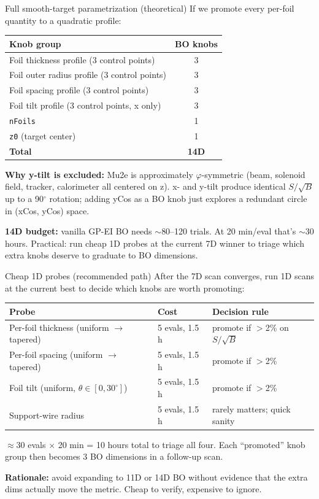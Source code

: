 \documentclass[10pt,aspectratio=169]{beamer}
\begin{document}
\begin{frame}{Full smooth-target parametrization (theoretical)}
If we promote every per-foil quantity to a quadratic profile:

\medskip
\begin{tabular}{lc}
\toprule
Knob group & BO knobs \\
\midrule
Foil thickness profile (3 control points) & 3 \\
Foil outer radius profile (3 control points) & 3 \\
Foil spacing profile (3 control points) & 3 \\
Foil tilt profile (3 control points, x only) & 3 \\
\texttt{nFoils} & 1 \\
\texttt{z0} (target center) & 1 \\
\midrule
\textbf{Total} & \textbf{14D} \\
\bottomrule
\end{tabular}

\medskip
\textbf{Why y-tilt is excluded:} Mu2e is approximately $\varphi$-symmetric (beam,
solenoid field, tracker, calorimeter all centered on z). x- and y-tilt produce
identical $S/\sqrt{B}$ up to a 90$^{\circ}$ rotation; adding yCos as a BO knob just
explores a redundant circle in (xCos, yCos) space.

\medskip
\textbf{14D budget:} vanilla GP-EI BO needs $\sim$80--120 trials. At 20 min/eval
that's $\sim$30 hours.
Practical: run cheap 1D probes at the current 7D winner to triage which extra knobs deserve to graduate to BO dimensions.
\end{frame}

\begin{frame}{Cheap 1D probes (recommended path)}
After the 7D scan converges, run 1D scans at the current best to decide which
knobs are worth promoting:

\medskip
\begin{tabular}{lll}
\toprule
Probe & Cost & Decision rule \\
\midrule
Per-foil thickness (uniform $\to$ tapered) & 5 evals, 1.5 h & promote if $>$2\% on $S/\sqrt{B}$ \\
Per-foil spacing (uniform $\to$ tapered) & 5 evals, 1.5 h & promote if $>$2\% \\
Foil tilt (uniform, $\theta\!\in\![0, 30^\circ]$) & 5 evals, 1.5 h & promote if $>$2\% \\
Support-wire radius & 5 evals, 1.5 h & rarely matters; quick sanity \\
\bottomrule
\end{tabular}

\medskip
$\approx$30 evals $\times$ 20 min = 10 hours total to triage all four. Each
``promoted'' knob group then becomes 3 BO dimensions in a follow-up scan.

\medskip
\textbf{Rationale:} avoid expanding to 11D or 14D BO without evidence that
the extra dims actually move the metric. Cheap to verify, expensive to ignore.
\end{frame}
\end{document}
